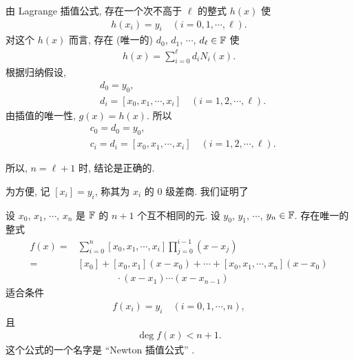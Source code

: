 \begin{pf}
    由 Lagrange 插值公式, 存在一个次不高于 $\ell$ 的整式 $h(x)$ 使
    \begin{align*}
        h(x_i) = y_i \quad (i = 0,1,\cdots,\ell).
    \end{align*}
    对这个 $h(x)$ 而言, 存在 (唯一的) $d_0$, $d_1$, $\cdots$, $d_{\ell} \in \mathbb{F}$ 使
    \begin{align*}
        h(x) = \sum_{i = 0}^{\ell} d_i N_{i} (x).
    \end{align*}
    根据归纳假设,
    \begin{align*}
         & d_0 = y_0,                                                 \\
         & d_i = [x_0, x_1, \cdots, x_i] \quad (i = 1,2,\cdots,\ell).
    \end{align*}
    由插值的唯一性, $g(x) = h(x)$. 所以
    \begin{align*}
         & c_0 = d_0 = y_0,                                                 \\
         & c_i = d_i = [x_0, x_1, \cdots, x_i] \quad (i = 1,2,\cdots,\ell).
    \end{align*}

    所以, $n = \ell + 1$ 时, 结论是正确的.
\end{pf}

为方便, 记 $[x_i] = y_i$, 称其为 $x_i$ 的 $0$ 级差商. 我们证明了

\begin{proposition}
    设 $x_0$, $x_1$, $\cdots$, $x_{n}$ 是 $\mathbb{F}$ 的 $n+1$ 个互不相同的元. 设 $y_0$, $y_1$, $\cdots$, $y_{n} \in \mathbb{F}$. 存在唯一的整式
    \begin{align*}
        f(x)
        = {} & \sum_{i = 0}^{n} [x_0, x_1, \cdots, x_i]
        \prod_{j = 0}^{i - 1} (x - x_j)                                                \\
        = {} & [x_0] + [x_0, x_1] (x - x_0) + \cdots + [x_0, x_1, \cdots, x_n] (x-x_0) \\
             & \qquad \qquad \cdot (x-x_1)\cdots (x-x_{n-1})
    \end{align*}
    适合条件
    \begin{align*}
        f(x_i) = y_i \quad (i = 0,1,\cdots,n),
    \end{align*}
    且
    \begin{align*}
        \deg f(x) < n + 1.
    \end{align*}
    这个公式的一个名字是 ``Newton 插值公式'' .
\end{proposition}

